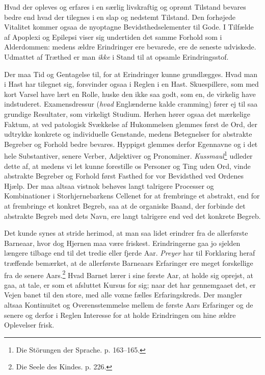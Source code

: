 \documentclass[12pt,a4paper,openany]{book}
\newcommand{\opage}[1]{\marginnote{\footnotesize\textit{[#1]}}}
\begin{document}
Hvad der opleves og erfares i en særlig livskraftig og oprømt Tilstand
bevares bedre end hvad der tilegnes i en slap og nedstemt Tilstand. Den
forhøjede Vitalitet kommer ogsaa de nyoptagne Bevidsthedselementer til
Gode. I Tilfælde af Apoplexi og Epilepsi viser sig undertiden det samme
Forhold som i Alderdommen: medens ældre Erindringer ere bevarede, ere de
seneste udviskede. Udmattet af Træthed er man \emph{ikke} i Stand til at
opsamle Erindringsstof.

Der maa Tid og Gentagelse til, for at Erindringer kunne grundlægges.
Hvad man i Hast har tilegnet sig, forsvinder ogsaa i Reglen i en Hast.
Skuespillere, som med kort Varsel have lært en Rolle, huske den ikke saa
godt, som en, de virkelig have indstuderet. Examensdressur (\emph{hvad}
Englænderne kalde cramming) fører ej til saa grundige Resultater, som
virkeligt Studium. Herhen hører ogsaa det mærkelige Faktum, at ved
patologisk Svækkelse af Hukommelsen glemmes først de Ord, der udtrykke
konkrete og individuelle Genstande, medens Betegnelser for abstrakte
Begreber og Forhold bedre bevares. Hyppigst glemmes derfor Egennavne og
i det hele Substantiver, senere Verber, Adjektiver og Pronominer.
\emph{Kussmaul}\footnote[1]{Die Störungen der Sprache. p. 163--165.}
udleder dette af, at medens vi let kunne forestille os Personer og Ting
uden Ord, vinde abstrakte Begreber og Forhold først Fasthed for vor
Bevidsthed ved Ordenes Hjælp.
\opage{182}Der maa altsaa vistnok behøves langt talrigere Processer og
Kombinationer i Storhjernebarkens Cellenet for at frembringe et
abstrakt, end for at frembringe et konkret Begreb, saa at de organiske
Baand, der forbinde det abstrakte Begreb med dets Navn, ere langt
talrigere end ved det konkrete Begreb.

Det kunde synes at stride herimod, at man saa lidet erindrer fra de
allerførste Barneaar, hvor dog Hjernen maa være friskest. Erindringerne
gaa jo sjelden længere tilbage end til det tredie eller fjerde Aar.
\emph{Preyer} har til Forklaring heraf træffende bemærket, at de
allerførste Barneaars Erfaringer ere meget forskellige fra de senere
Aars.\footnote[1]{Die Seele des Kindes. p. 226.} Hvad Barnet lærer i
sine første Aar, at holde sig oprejst, at gaa, at tale, er som et
afsluttet Kursus for sig; naar det har gennemgaaet det, er Vejen banet
til den store, med alle voxne fælles Erfaringskreds. Der mangler altsaa
Kontinuitet og Overensstemmelse mellem de første Aars Erfaringer og de
senere og derfor i Reglen Interesse for at holde Erindringen om hine
ældre Oplevelser frisk.
\end{document}
